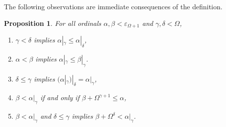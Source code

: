 \documentclass[UKenglish,cleveref,DIV=12]{scrartcl}
\newtheorem{proposition}[lemma]{Proposition}
\theoremstyle{definition}
\theoremstyle{definition}
\begin{document}
The following observations are immediate consequences of the definition.
\begin{proposition}\label{prop:morditems} For all ordinals $\alpha, \beta<\varepsilon_{\Omega+1}$ and $\gamma,\delta<\Omega$,
\begin{enumerate}
  \item $\gamma<\delta$ implies $\alpha|_\gamma\le \alpha|_\delta$,
  \item $\alpha<\beta$ implies $\alpha|_\gamma\le \beta|_\gamma$.
  \item $\delta\le\gamma$ implies $(\alpha| _\gamma)|_\delta=\alpha|_\gamma$,
  \item $\beta<\alpha|_\gamma$ if and only if $\beta+\Omega^{\gamma+1}\le \alpha$,
  \item $\beta<\alpha|_\gamma$ and $\delta\le\gamma$ implies $\beta+\Omega^\delta<\alpha|_\gamma$.\label{item:morditem4}
\end{enumerate}
\end{proposition}
%
%
%
\end{document}
